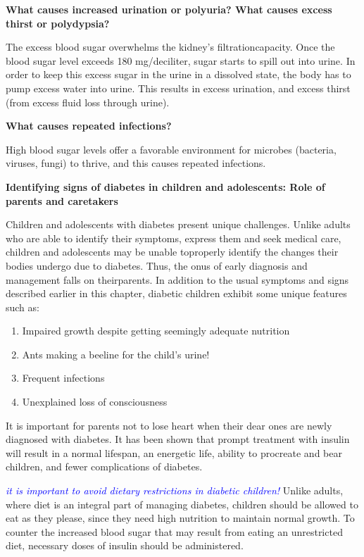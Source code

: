 \noindent
\textbf{What causes increased urination or polyuria? What causes excess thirst or polydypsia?}

The excess blood sugar overwhelms the kidney’s filtration\break capa\-city. Once the blood sugar level exceeds 180 mg/deciliter, sugar starts to spill out into urine. In order to keep this excess sugar in the urine in a dissolved state, the body has to pump excess water into urine. This results in excess urination, and excess thirst (from excess fluid loss through urine).

\noindent
\textbf{What causes repeated infections?}

High blood sugar levels offer a favorable environment for microbes (bacteria, viruses, fungi) to thrive, and this causes repeated infections.

\noindent
\textbf{Identifying signs of diabetes in children and adolescents: Role of parents and caretakers}

Children and adolescents with diabetes present unique challenges. Unlike adults who are able to identify their symptoms, express them and seek medical care, children and adolescents may be unable to\break pro\-perly identify the changes their bodies undergo due to diabetes. Thus, the onus of early diagnosis and management falls on their\break parents. In addition to the usual symptoms and signs described earlier in this chapter, diabetic children exhibit some unique features such as:

\vspace{-\topsep}
\begin{enumerate}[\ding{226}]
\itemsep=0pt
\item Impaired growth despite getting seemingly adequate nutrition
\item Ants making a beeline for the child’s urine!
\item Frequent infections
\item Unexplained loss of consciousness
\end{enumerate}
\vspace{-\topsep}

It is important for parents not to lose heart when their dear ones are newly diagnosed with diabetes. It has been shown that prompt treatment with insulin will result in a normal lifespan, an energetic life, ability to procreate and bear children, and fewer complications of diabetes.

\textcolor{blue}{\textit{it is important to avoid dietary restrictions in diabetic children!}} Unlike adults, where diet is an integral part of managing diabetes, children should be allowed to eat as they please, since they need high nutrition to maintain normal growth. To counter the increased blood sugar that may result from eating an unrestricted diet, necessary doses of insulin should be administered.



